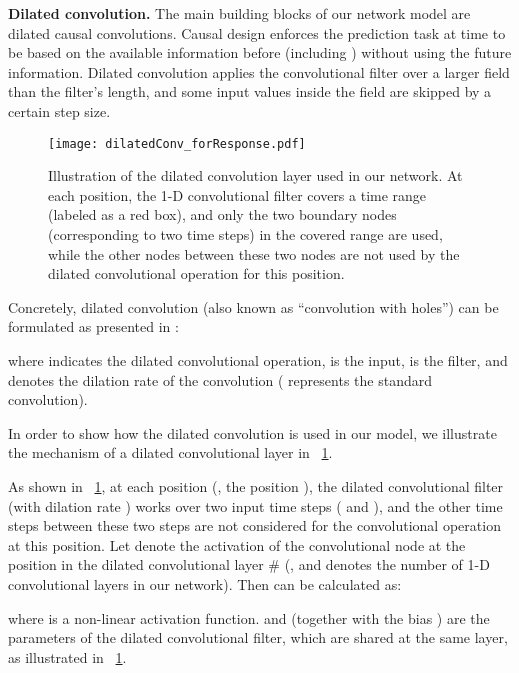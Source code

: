 \documentclass[10pt,twocolumn,letterpaper]{article}
\begin{document}
\textbf{Dilated convolution.}
The main building blocks of our network model are dilated causal convolutions. Causal design \cite{van2016wavenet} enforces the prediction task at time  to be based on the available information before  (including ) without using the future information.
Dilated convolution \cite{YuKoltun2016} applies the convolutional filter over a larger field than the filter's length,
and some input values inside the field are skipped by a certain step size.

\begin{figure}[tp]
	\centerline{\texttt{[image: dilatedConv\_forResponse.pdf]}}
	\caption{Illustration of the dilated convolution layer used in our network.
            At each position, the 1-D convolutional filter covers a time range (labeled as a red box),
            and only the two boundary nodes (corresponding to two time steps) in the covered range are used, while the other nodes between these two nodes are not used by the dilated convolutional operation for this position.
            }
	\label{fig:dilatedCausalConv}
\end{figure}

Concretely, dilated convolution (also known as ``convolution with holes'') can be formulated as presented in \cite{YuKoltun2016}:

where  indicates the dilated convolutional operation,  is the input,  is the filter,
and  denotes the dilation rate of the convolution ( represents the standard convolution).

In order to show how the dilated convolution is used in our model,
we illustrate the mechanism of a dilated convolutional layer in \figurename{~\ref{fig:dilatedCausalConv}}.

As shown in \figurename{~\ref{fig:dilatedCausalConv}},
at each position (\eg, the position ), the dilated convolutional filter (with dilation rate ) works over two input time steps ( and ),
and the other time steps between these two steps are not considered for the convolutional operation at this position.
Let  denote the activation of the convolutional node at the position  in the dilated convolutional layer \#
(, and  denotes the number of 1-D convolutional layers in our network).
Then  can be calculated as:

where  is a non-linear activation function.
 and  (together with the bias ) are the parameters of the dilated convolutional filter,
which are shared at the same layer, as illustrated in \figurename{~\ref{fig:dilatedCausalConv}}.
\end{document}
